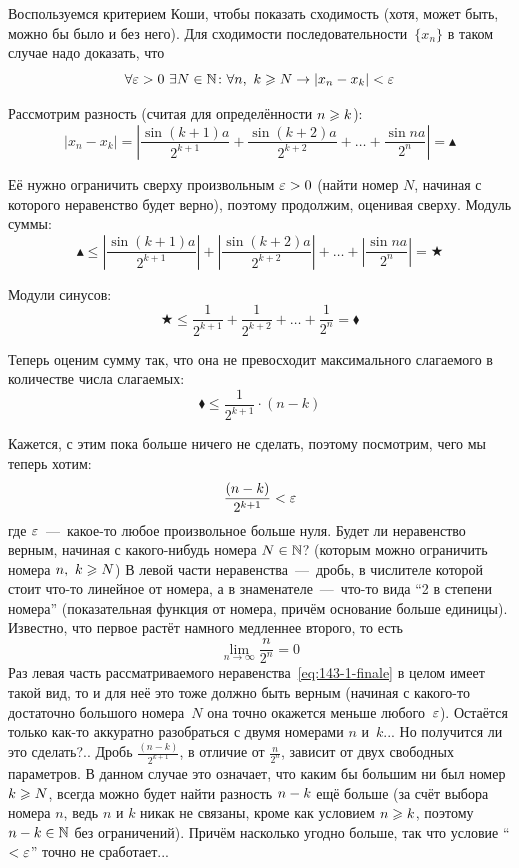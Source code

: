 \documentclass[a4paper,12pt]{article}
\begin{document}
  \begin{solution}
    Воспользуемся критерием Коши, чтобы показать сходимость (хотя, может быть, можно бы было и без него).
    Для сходимости последовательности~$\{x_n\}$ в таком случае надо доказать, что
    \[
      \forall \varepsilon > 0\ \exists N \in \mathbb N\colon \forall n,\ k \geqslant N \to |x_n - x_k| < \varepsilon
    \]
     
    Рассмотрим разность (считая для определённости $n \hm\geq k$):
    \[
      |x_n - x_k|
        = \left|\frac{\sin{(k + 1)a}}{2^{k + 1}} + \frac{\sin{(k + 2)a}}{2^{k + 2}} + \ldots + \frac{\sin{na}}{2^n}\right|
        = \blacktriangle
    \]
    
    Её нужно ограничить сверху произвольным $\eps \hm> 0$ (найти номер $N$, начиная с которого неравенство будет верно), поэтому продолжим, оценивая сверху.
    Модуль суммы:
    \[
      \blacktriangle \leq \left|\frac{\sin{(k + 1)a}}{2^{k + 1}}\right| + \left|\frac{\sin{(k + 2)a}}{2^{k + 2}}\right| + \ldots + \left|\frac{\sin{na}}{2^n}\right| = \bigstar
    \]
    
    Модули синусов:
    \[
      \bigstar \leq \frac{1}{2^{k + 1}} + \frac{1}{2^{k + 2}} + \ldots + \frac{1}{2^n} = \blacklozenge
    \]
    
    Теперь оценим сумму так, что она не превосходит максимального слагаемого в количестве числа слагаемых:
    \[
      \blacklozenge \leq \frac{1}{2^{k + 1}} \cdot (n - k)
    \]
    
    Кажется, с этим пока больше ничего не сделать, поэтому посмотрим, чего мы теперь хотим:
    \begin{equation}\label{eq:143-1-finale}
      \frac{(n - k)}{2^{k + 1}} < \varepsilon
    \end{equation}
    где $\varepsilon$~---~какое-то любое произвольное больше нуля.
    Будет ли неравенство верным, начиная с какого-нибудь номера $N \hm\in \NN$? (которым можно ограничить номера $n,\ k \hm\geq N$)
    В левой части неравенства~---~дробь, в числителе которой стоит что-то линейное от номера, а в знаменателе~---~что-то вида ``2 в степени номера'' (показательная функция от номера, причём основание больше единицы).
    Известно, что первое растёт намного медленнее второго, то есть
    \[
      \lim_{n \to \infty} \frac{n}{2^n} = 0
    \]
    Раз левая часть рассматриваемого неравенства~\eqref{eq:143-1-finale} в целом имеет такой вид, то и для неё это тоже должно быть верным (начиная с какого-то достаточно большого номера~$N$ она точно окажется меньше любого~$\varepsilon$).
    Остаётся только как-то аккуратно разобраться с двумя номерами $n$ и~$k$...
    Но получится ли это сделать?..
    Дробь $\frac{(n - k)}{2^{k + 1}}$, в отличие от $\frac{n}{2^n}$, зависит от двух свободных параметров.
    В данном случае это означает, что каким бы большим ни был номер $k \hm\geq N$, всегда можно будет найти разность $n \hm- k$ ещё больше (за счёт выбора номера $n$, ведь $n$ и $k$ никак не связаны, кроме как условием $n \hm\geq k$, поэтому $n \hm- k \hm\in \NN$ без ограничений).
    Причём насколько угодно больше, так что условие ``$< \varepsilon$'' точно не сработает...
    

\end{solution}
\end{document}
